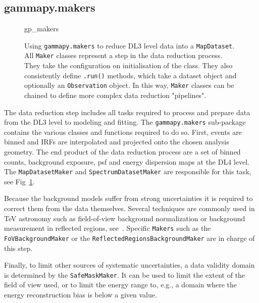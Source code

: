 \documentclass[traditabstract, longauth]{aa}
\newcommand{\code}[1]{\texttt{#1}}
\begin{document}
\subsection{gammapy.makers}
\label{ssec:gammapy-makers}
%
\begin{figure}
	\small
    {gp_makers}
	\caption{
        Using \code{gammapy.makers} to reduce DL3 level data into a
		\code{MapDataset}. All \code{Maker} classes represent 
		a step in the data reduction process. They take
        the configuration on initialisation of the class. They 
		also consistently define \code{.run()} methods, which take
		a dataset object and optionally an \code{Observation} 
		object. In this way, \code{Maker} classes can be chained
		to define more complex data reduction "pipelines".
    }
	\label{ig*:minted:gp_makers}
\end{figure}
%
The data reduction step includes all tasks required to process and prepare
\gammaray data from the DL3 level to modeling and fitting. The \code{gammapy.makers} sub-package
contains the various classes and functions required to do so. First, events are
binned and IRFs are interpolated and projected onto the chosen analysis
geometry. The end product of the data reduction process are a set of binned counts,
background exposure, psf and energy dispersion maps at the DL4 level. 
The \code{MapDatasetMaker} and \code{SpectrumDatasetMaker} are
responsible for this task, see Fig~\ref{ig*:minted:gp_makers}.

Because the background models suffer from strong uncertainties it is required
to correct them from the data themselves. Several techniques are commonly used
in TeV \gammaray astronomy such as field-of-view background normalization or
background measurement in reflected regions, see~\cite{Berge07}.
Specific \code{Makers} such as the \code{FoVBackgroundMaker} or the
\code{ReflectedRegionsBackgroundMaker} are in charge of this step.

Finally, to limit other sources of systematic uncertainties, a data validity
domain is determined by the \code{SafeMaskMaker}. It can be used to limit the
extent of the field of view used, or to limit the energy range to, e.g., a domain
where the energy reconstruction bias is below a given value.
\end{document}
